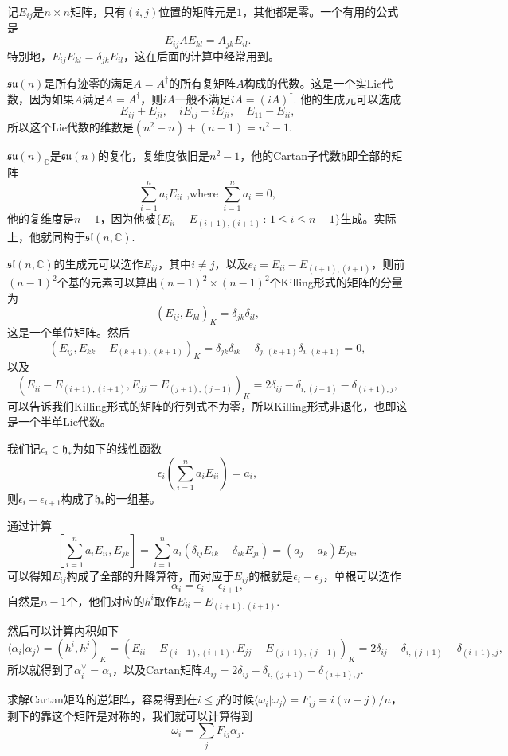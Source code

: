 \documentclass[9pt]{extarticle}
\newcommand{\cc}{\mathbb{C}}
\begin{document}
记$E_{ij}$是$n\times n$矩阵，只有$(i,j)$位置的矩阵元是$1$，其他都是零。一个有用的公式是
\[
	E_{ij}AE_{kl}=A_{jk}E_{il}.
\]
特别地，$E_{ij}E_{kl}=\delta_{jk}E_{il}$，这在后面的计算中经常用到。

\para $\mathfrak{su}(n)$是所有迹零的满足$A=A^\dag$的所有复矩阵$A$构成的代数。这是一个实Lie代数，因为如果$A$满足$A=A^\dag$，则$iA$一般不满足$iA=(iA)^\dag$. 他的生成元可以选成
\[
	E_{ij}+E_{ji},\quad iE_{ij}-iE_{ji},\quad E_{11}-E_{ii},
\]
所以这个Lie代数的维数是$(n^2-n)+(n-1)=n^2-1$.

\para $\mathfrak{su}(n)_\cc$是$\mathfrak{su}(n)$的复化，复维度依旧是$n^2-1$，他的Cartan子代数$\mathfrak{h}$即全部的矩阵
\[
	\sum_{i=1}^n a_i E_{ii} \text{ ,where } \sum_{i=1}^n  a_i=0,
\]
他的复维度是$n-1$，因为他被$\{E_{ii}-E_{(i+1),(i+1)}\,:\, 1\leq i \leq n-1\}$生成。实际上，他就同构于$\mathfrak{sl}(n,\cc)$.

$\mathfrak{sl}(n,\cc)$的生成元可以选作$E_{ij}$，其中$i\neq j$，以及$e_i=E_{ii}-E_{(i+1),(i+1)}$，则前$(n-1)^2$个基的元素可以算出$(n-1)^2\times (n-1)^2$个Killing形式的矩阵的分量为
\[
	(E_{ij},E_{kl})_K=\delta_{jk}\delta_{il},
\]
这是一个单位矩阵。然后
\[
	(E_{ij},E_{kk}-E_{(k+1),(k+1)})_K=\delta_{jk}\delta_{ik}-\delta_{j,(k+1)}\delta_{i,(k+1)}=0,
\]
以及
\[
	(E_{ii}-E_{(i+1),(i+1)},E_{jj}-E_{(j+1),(j+1)})_K=2\delta_{ij}-\delta_{i,(j+1)}-\delta_{(i+1),j},
\]
可以告诉我们Killing形式的矩阵的行列式不为零，所以Killing形式非退化，也即这是一个半单Lie代数。

我们记$\epsilon_i \in \mathfrak{h}_*$为如下的线性函数
\[
	 \epsilon_i\left(\sum_{i=1}^n a_i E_{ii}\right)=a_i,
\]
则$\epsilon_i-\epsilon_{i+1}$构成了$\mathfrak{h}_*$的一组基。

通过计算
\[
	\left [\sum_{i=1}^n a_i E_{ii},E_{jk}\right ]=\sum_{i=1}^n  a_i(\delta_{ij}E_{ik}-\delta_{ik}E_{ji})=(a_j-a_k)E_{jk},
\]
可以得知$E_{ij}$构成了全部的升降算符，而对应于$E_{ij}$的根就是$\epsilon_i-\epsilon_j$，单根可以选作
\[
	\alpha_i = \epsilon_i-\epsilon_{i+1},
\]
自然是$n-1$个，他们对应的$h^i$取作$E_{i i}-E_{(i+1),(i+1)}$.

然后可以计算内积如下
\[
	\langle \alpha_i|\alpha_j\rangle = (h^i,h^j)_K=(E_{ii}-E_{(i+1),(i+1)},E_{jj}-E_{(j+1),(j+1)})_K=2\delta_{ij}-\delta_{i,(j+1)}-\delta_{(i+1),j},
\]
所以就得到了$\alpha^\vee_i=\alpha_i$，以及Cartan矩阵$A_{ij}=2\delta_{ij}-\delta_{i,(j+1)}-\delta_{(i+1),j}$. 

\para 求解Cartan矩阵的逆矩阵，容易得到在$i\leq j$的时候$\langle \omega_i|\omega_j\rangle=F_{ij}=i(n-j)/n$，剩下的靠这个矩阵是对称的，我们就可以计算得到
\[
	\omega_i=\sum_j F_{ij}\alpha_j.
\]
\end{document}
